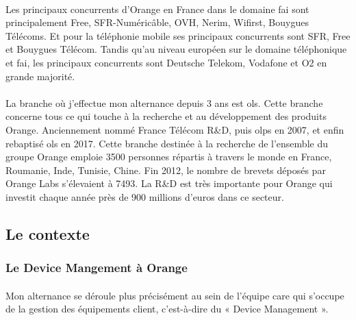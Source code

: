 \documentclass[12pt,a4paper]{report}
\begin{document}
\paragraph*{}
Les principaux concurrents d'Orange en France dans le domaine \gls{fai} sont principalement Free, SFR-Numéricâble, OVH, Nerim, Wifirst, Bouygues Télécoms. Et pour la téléphonie mobile ses principaux concurrents sont SFR, Free et Bouygues Télécom. Tandis qu'au niveau européen sur le domaine téléphonique et \gls{fai}, les principaux concurrents sont Deutsche Telekom, Vodafone et O2 en grande majorité.
\paragraph*{}
La branche où j’effectue mon alternance depuis 3 ans est \gls{ols}. Cette branche concerne tous ce qui touche à la recherche et au développement des produits Orange. Anciennement nommé France Télécom R\&D, puis \gls{olps} en 2007, et enfin rebaptisé \gls{ols} en 2017. Cette branche destinée à la recherche de l’ensemble du groupe Orange emploie 3500 personnes répartis à travers le monde en France, Roumanie, Inde, Tunisie, Chine. Fin 2012, le nombre de brevets déposés par Orange Labs s’élevaient à 7493. La R\&D est très importante pour Orange qui investit chaque année près de 900 millions d’euros dans ce secteur. \\

\subsection{Le contexte}
\subsubsection{Le Device Mangement à Orange}
\paragraph*{}
Mon alternance se déroule plus précisément au sein de l’équipe \gls{care}  qui s’occupe de la gestion des équipements client, c’est-à-dire du « Device Management ».
\end{document}
